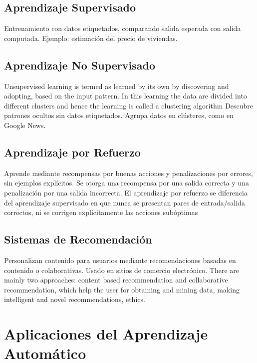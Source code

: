 \documentclass[12pt]{article}
\begin{document}
\subsection{Aprendizaje Supervisado}
Entrenamiento con datos etiquetados, comparando salida esperada con salida computada. Ejemplo: estimaci\'on del precio de viviendas.

\subsection{Aprendizaje No Supervisado}
Unsupervised learning is termed as learned by its own by discovering and adopting, based on the input pattern. In this  learning the data are divided into different clusters and hence the learning is called a clustering algorithm Descubre patrones ocultos sin datos etiquetados. Agrupa datos en cl\'usteres, como en Google News.

\subsection{Aprendizaje por Refuerzo}
Aprende mediante recompensas por buenas acciones y penalizaciones por errores, sin ejemplos expl\'icitos. Se otorga una recompensa por una salida correcta y una penalización por una salida incorrecta. El aprendizaje por refuerzo se diferencia del aprendizaje supervisado en que nunca se presentan pares de entrada/salida correctos, ni se corrigen explícitamente las acciones subóptimas

\subsection{Sistemas de Recomendaci\'on}
Personalizan contenido para usuarios mediante recomendaciones basadas en contenido o colaborativas. Usado en sitios de comercio electr\'onico. There are mainly two approaches: content based recommendation and collaborative recommendation, which help the user for obtaining and mining data, making intelligent and novel recommendations, ethics. 

\section{Aplicaciones del Aprendizaje Autom\'atico}
\end{document}
